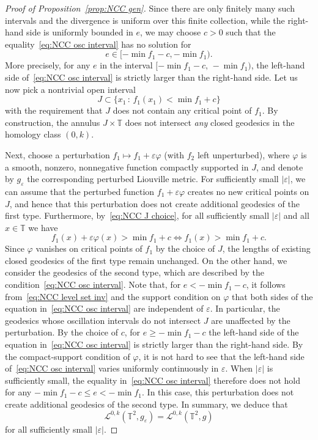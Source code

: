 \documentclass[11pt,letterpaper,oneside]{amsart}
\newcommand{\T}{\mathbb{T}}
\renewcommand{\phi}{\varphi}
\theoremstyle{definition}
\theoremstyle{remark}
\newcommand{\eps}{\varepsilon}
\theoremstyle{definition}
\theoremstyle{remark}
\newcommand{\CL}{\mathcal{L}}
\begin{document}
\begin{proof}[Proof of Proposition~\ref{prop:NCC gen}]
\medskip

    Since there are only finitely many such intervals and the divergence is uniform over this finite collection, while the right-hand side is uniformly bounded in $e$, we may choose $c>0$ such that the equality~\eqref{eq:NCC osc interval} has no solution for
    \[
    e\in[-\min f_1-c,-\min f_1).
    \]
    More precisely, for any $e$ in the interval $[-\min f_1 - c,\, -\min f_1)$, the left-hand side of~\eqref{eq:NCC osc interval} is strictly larger than the right-hand side. 
    Let us now pick a nontrivial open interval
    \begin{equation}\label{eq:NCC J choice}
        J \subset \{x_1 \, : \, f_1(x_1) < \min f_1 + c\}
    \end{equation}
    with the requirement that $J$ does not contain any critical point of $f_1$. By construction, the annulus $J \times \T$ does not intersect \textit{any} closed geodesics in the homology class $(0,k)$.

    \medskip
    
	Next, choose a perturbation $f_1\mapsto f_1+\eps\phi$ (with $f_2$ left unperturbed), where $\phi$ is a smooth, nonzero, nonnegative function compactly supported in $J$, and denote by $g_\eps$ the corresponding perturbed Liouville metric.
    For sufficiently small $|\eps|$, we can assume that the perturbed function $f_1 + \eps \phi$ creates no new critical points on $J$, and hence that this perturbation does not create additional geodesics of the first type.
    Furthermore, by~\eqref{eq:NCC J choice}, for all sufficiently small $|\eps|$ and all $x \in \T$ we have
    \begin{equation}\label{eq:NCC level set inv}
        f_1(x) + \eps \phi(x) > \min f_1 + c \iff f_1(x) > \min f_1 + c.
    \end{equation}
	Since $\phi$ vanishes on critical points of $f_1$ by the choice of $J$, the lengths of existing closed geodesics of the first type remain unchanged. 
	On the other hand, we consider the geodesics of the second type, which are described by the condition~\eqref{eq:NCC osc interval}.
    Note that, for $e < -\min f_1 - c$, it follows from~\eqref{eq:NCC level set inv} and the support condition on $\phi$ that both sides of the equation in~\eqref{eq:NCC osc interval} are independent of $\eps$.
    In particular, the geodesics whose oscillation intervals do not intersect $J$ are unaffected by the perturbation.
    By the choice of $c$, for $e \geq -\min f_1 - c$ the left-hand side of the equation in~\eqref{eq:NCC osc interval} is strictly larger than the right-hand side.
    By the compact-support condition of $\phi$, it is not hard to see that the left-hand side of~\eqref{eq:NCC osc interval} varies uniformly continuously in $\eps$.
    When $|\eps|$ is sufficiently small, the equality in~\eqref{eq:NCC osc interval} therefore does not hold for any $-\min f_1 - c \leq e < - \min f_1$.
    In this case, this perturbation does not create additional geodesics of the second type.
	In summary, we deduce that 
    \[
        \CL^{0,k}(\T^2,g_\eps) = \CL^{0,k}(\T^2, g)
    \] 
    for all sufficiently small $|\eps|$.


\end{proof}
\end{document}
